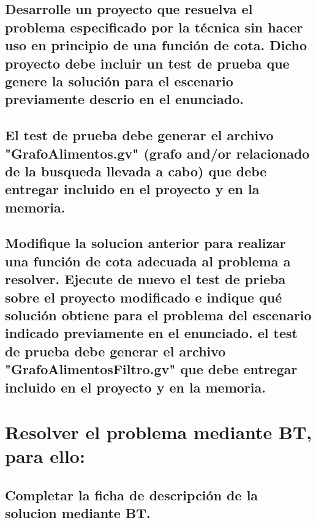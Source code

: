 \documentclass[a4paper,12pt]{article}
\begin{document}
\subsection{Desarrolle un proyecto que resuelva el problema especificado por la técnica sin hacer uso en principio de una función de cota. Dicho proyecto debe incluir un test de prueba que genere la solución para el escenario previamente descrio en el enunciado.}
\subsection{El test de prueba debe generar el archivo "GrafoAlimentos.gv" (grafo and/or relacionado de la busqueda llevada a cabo) que debe entregar incluido en el proyecto y en la memoria.}
\subsection{Modifique la solucion anterior para realizar una función de cota adecuada al problema a resolver. Ejecute de nuevo el test de prieba sobre el proyecto modificado e indique qué solución obtiene para el problema del escenario indicado previamente en el enunciado. el test de prueba debe generar el archivo "GrafoAlimentosFiltro.gv" que debe entregar incluido en el proyecto y en la memoria.}


\section{Resolver el problema mediante BT, para ello:}
\subsection{Completar la ficha de descripción de la solucion mediante BT.}
\end{document}
